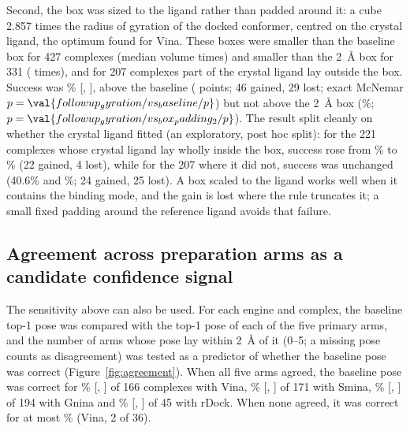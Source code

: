 Second, the box was sized to the ligand rather than padded around it: a cube 2.857 times
the radius of gyration of the docked conformer, centred on the crystal ligand, the
optimum \citet{feinstein2015boxsize} found for Vina. These boxes were smaller than the
baseline box for 427 complexes (median volume  times) and smaller than the
\SI{2}{\angstrom} box for 331 ( times), and for 207 complexes part of the crystal
ligand lay outside the box. Success was \% [, ], above the baseline (
points; 46 gained, 29 lost; exact McNemar $p = \val{followup_gyration/vs_baseline/p}$) but not above the
\SI{2}{\angstrom} box (\%; $p = \val{followup_gyration/vs_box_padding_2/p}$). The result split cleanly on whether the
crystal ligand fitted (an exploratory, post hoc split): for the 221 complexes whose
crystal ligand lay wholly inside the box, success rose from \% to \% (22 gained,
4 lost), while for the 207 where it did not, success was unchanged (40.6\% and \%; 24
gained, 25 lost). A box scaled to the ligand works well when it contains the binding
mode, and the gain is lost where the rule truncates it; a small fixed padding around the
reference ligand avoids that failure.

\subsection{Agreement across preparation arms as a candidate confidence signal}
\label{sec:agreement}

The sensitivity above can also be used. For each engine and complex, the baseline top-1
pose was compared with the top-1 pose of each of the five primary arms, and the number of
arms whose pose lay within \SI{2}{\angstrom} of it (0--5; a missing pose counts as
disagreement) was tested as a predictor of whether the baseline pose was correct
(Figure~\ref{fig:agreement}). When all five arms agreed, the baseline pose was correct for
\% [, ] of 166 complexes with Vina, \% [, ] of 171 with Smina,
\% [, ] of 194 with Gnina and \% [, ] of 45 with rDock. When none
agreed, it was correct for at most \% (Vina, 2 of 36).

